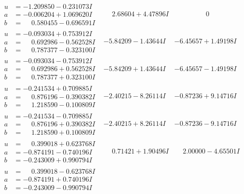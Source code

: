 \documentclass[1p]{elsarticle_modified}
\theoremstyle{definition}
\begin{document}
$$\begin{array}{c|c|c}
\begin{aligned}
u &= -1.209850 - 0.231073 I \\
a &= -0.006204 + 1.069620 I \\
b &= \phantom{-}0.580455 - 0.696591 I\end{aligned}
 & \phantom{-}2.68604 + 4.47896 I & \phantom{-0.000000 } 0 \\ \hline\begin{aligned}
u &= -0.093034 + 0.753912 I \\
a &= \phantom{-}0.692986 - 0.562528 I \\
b &= \phantom{-}0.787377 - 0.323100 I\end{aligned}
 & -5.84209 - 1.43644 I & -6.45657 + 1.49198 I \\ \hline\begin{aligned}
u &= -0.093034 - 0.753912 I \\
a &= \phantom{-}0.692986 + 0.562528 I \\
b &= \phantom{-}0.787377 + 0.323100 I\end{aligned}
 & -5.84209 + 1.43644 I & -6.45657 - 1.49198 I \\ \hline\begin{aligned}
u &= -0.241534 + 0.709885 I \\
a &= \phantom{-}0.876196 - 0.390382 I \\
b &= \phantom{-}1.218590 - 0.100809 I\end{aligned}
 & -2.40215 - 8.26114 I & -0.87236 + 9.14716 I \\ \hline\begin{aligned}
u &= -0.241534 - 0.709885 I \\
a &= \phantom{-}0.876196 + 0.390382 I \\
b &= \phantom{-}1.218590 + 0.100809 I\end{aligned}
 & -2.40215 + 8.26114 I & -0.87236 - 9.14716 I \\ \hline\begin{aligned}
u &= \phantom{-}0.399018 + 0.623768 I \\
a &= -0.874191 - 0.740196 I \\
b &= -0.243009 + 0.990794 I\end{aligned}
 & \phantom{-}0.71421 + 1.90496 I & \phantom{-}2.00000 - 4.65501 I \\ \hline\begin{aligned}
u &= \phantom{-}0.399018 - 0.623768 I \\
a &= -0.874191 + 0.740196 I \\
b &= -0.243009 - 0.990794 I\end{aligned}

\end{array}$$
\end{document}
